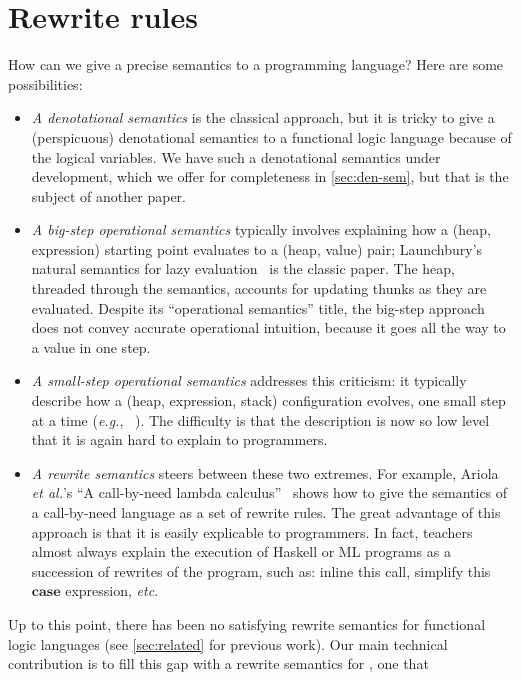 \documentclass[acmsmall]{acmart}
\newcommand{\eg}{\emph{e.g.}\xspace}
\newcommand{\etc}{\emph{etc.}\xspace}
\newcommand{\etal}{\emph{et al.}\xspace}
\begin{document}
\section{Rewrite rules} \label{sec:rewrite-rules}

How can we give a precise semantics to a programming language?
Here are some possibilities:
\begin{itemize}
\item \emph{A denotational semantics} is the classical approach,
  but it is tricky to give a (perspicuous) denotational semantics to a functional logic language
  because of the logical variables.  We have such a denotational semantics under development,
  which we offer for completeness in \cref{sec:den-sem}, but that is the subject of another paper.
\item \emph{A big-step operational semantics} typically involves explaining how a (heap, expression) starting point
  evaluates to a (heap, value) pair; Launchbury's natural semantics for lazy evaluation~\cite{launchbury:natural} is the classic paper.  The heap, threaded through the semantics, accounts for updating thunks as they are evaluated.
  Despite its ``operational semantics'' title, the big-step approach
  does not convey accurate operational intuition, because it goes all the way to a value
  in one step.
\item \emph{A small-step operational semantics} addresses this criticism:
  it typically describe how a (heap, expression, stack) configuration evolves, one small
  step at a time ({\eg}, ~\cite{pj:stg-machine}).
  The difficulty is that the description is now so low level that it is again hard to explain to programmers.
\item \emph{A rewrite semantics} steers between these two extremes.
  For example, Ariola {\etal}'s ``A call-by-need lambda calculus''~\cite{ariola:call-by-need} shows how
  to give the semantics of a call-by-need language as a set of rewrite rules. The great
  advantage of this approach is that it is easily explicable to programmers.
  In fact, teachers almost always explain the execution of Haskell or ML programs as a succession of rewrites
  of the program, such as: inline this call, simplify this \ensuremath{\textbf{case}} expression, \etc
\end{itemize}
Up to this point, there has been no satisfying rewrite semantics for functional logic languages
(see \cref{sec:related} for previous work).
Our main technical contribution is to fill this gap with a rewrite semantics for \versecalc{}, one that
\end{document}

